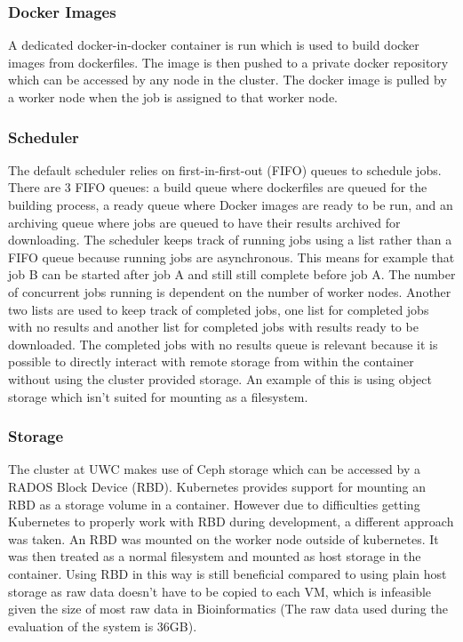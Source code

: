 \documentclass{sig-alternate-05-2015}
\begin{document}
\subsubsection{Docker Images}
A dedicated docker-in-docker container is run which is used to build docker images from dockerfiles. The image is then pushed to a private docker repository which can be accessed by any node in the cluster. The docker image is pulled by a worker node when the job is assigned to that worker node.

\subsubsection{Scheduler}
The default scheduler relies on first-in-first-out (FIFO) queues to schedule jobs. There are 3 FIFO queues: a build queue where dockerfiles are queued for the building process, a ready queue where Docker images are ready to be run, and an archiving queue where jobs are queued to have their results archived for downloading. The scheduler keeps track of running jobs using a list rather than a FIFO queue because running jobs are asynchronous. This means for example that job B can be started after job A and still still complete before job A. The number of concurrent jobs running is dependent on the number of worker nodes. Another two lists are used to keep track of completed jobs, one list for completed jobs with no results and another list for completed jobs with results ready to be downloaded. The completed jobs with no results queue is relevant because it is possible to directly interact with remote storage from within the container without using the cluster provided storage. An example of this is using object storage which isn't suited for mounting as a filesystem.

\subsubsection{Storage}
The cluster at UWC makes use of Ceph storage which can be accessed by a RADOS Block Device (RBD). Kubernetes provides support for mounting an RBD as a storage volume in a container. However due to difficulties getting Kubernetes to properly work with RBD during development, a different approach was taken. An RBD was mounted on the worker node outside of kubernetes. It was then treated as a normal filesystem and mounted as host storage in the container. Using RBD in this way is still beneficial compared to using plain host storage as raw data doesn't have to be copied to each VM, which is infeasible given the size of most raw data in Bioinformatics (The raw data used during the evaluation of the system is 36GB).
\end{document}

